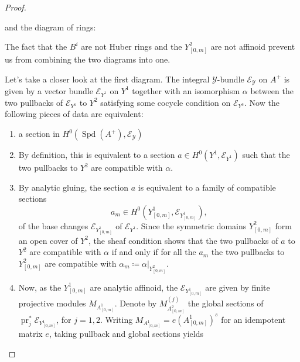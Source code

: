 \documentclass[10pt,twoside]{article}
\numberwithin{equation}{section}
\theoremstyle{plain}
\theoremstyle{definition}
\DeclareMathOperator{\Spd}{Spd}
\newcommand{\MCE}{\mathcal{E}}
\newcommand{\MCY}{\mathcal{Y}}
\begin{document}
\begin{proof}
\begin{center}
\end{center}
and the diagram of rings:
\begin{center}
\end{center}
The fact that the \(B^i\) are not Huber rings and the \(Y^2_{[0,m]}\) are not affinoid prevent us from combining the two diagrams into one.\par
Let's take a closer look at the first diagram. The integral \(\MCY\)-bundle \(\MCE_{\MCY}\) on \(A^+\) is given by a vector bundle \(\MCE_{Y^1}\) on \(Y^{1}\) together with an isomorphism \(\alpha\) between the two pullbacks of \(\MCE_{Y^1}\) to \(Y^{2}\) satisfying some cocycle condition on \(\MCE_{Y^3}\). Now the following pieces of data are equivalent:
\begin{enumerate}
    \item a section in \(H^0(\Spd(A^+),\MCE_{\MCY})\)
    \item By definition, this is equivalent to a section \(a\in H^0(Y^{1}, \MCE_{Y^1})\) such that the two pullbacks to \(Y^{2}\) are compatible with \(\alpha\).
    \item By analytic gluing, the section \(a\) is equivalent to a family of compatible sections 
    \[a_m\in H^0(Y^{1}_{[0,m]}, \MCE_{Y^1_{[0,m]}}),\]
    of the base changes \(\MCE_{Y^1_{[0,m]}}\) of \(\MCE_{Y^1}\). Since the symmetric domains \(Y^2_{[0,m]}\) form an open cover of \(Y^2\), the sheaf condition shows that the two pullbacks of \(a\) to \(Y^2\) are compatible with \(\alpha\) if and only if for all the \(a_m\) the two pullbacks to \(Y^{2}_{[0,m]}\) are compatible with \(\alpha_m\coloneqq \alpha|_{Y^2_{[0,m]}}\).
    \item Now, as the \(Y^1_{[0,m]}\) are analytic affinoid, the \(\MCE_{Y^1_{[0,m]}}\) are given by finite projective modules \(M_{A^1_{[0,m]}}\). Denote by \(M^{(j)}_{A^2_{[0,m]}}\) the global sections of \(\operatorname{pr}_j^*\MCE_{Y^1_{[0,m]}}\), for \(j=1,2\). Writing \(M_{A^1_{[0,m]}}=e(A^1_{[0,m]})^s\) for an idempotent matrix \(e\), taking pullback and global sections yields

\end{enumerate}
\end{proof}
\end{document}
